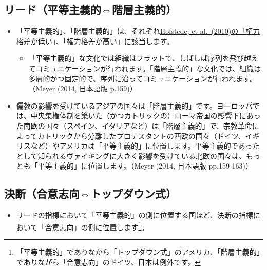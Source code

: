 \documentclass[
]{book}
\providecommand{\tightlist}{%
  \setlength{\itemsep}{0pt}\setlength{\parskip}{0pt}}
\begin{document}
\hypertarget{ux30eaux30fcux30c9ux5e73ux7b49ux4e3bux7fa9ux7684ux968eux5c64ux4e3bux7fa9ux7684}{%
\subsection{リード（平等主義的⇔階層主義的）}\label{ux30eaux30fcux30c9ux5e73ux7b49ux4e3bux7fa9ux7684ux968eux5c64ux4e3bux7fa9ux7684}}

\begin{itemize}
\item
  「平等主義的」、「階層主義的」は、それぞれ\protect\hyperlink{hofstede}{Hofstede, et al.~(2010)の「権力格差が低い」、「権力格差が高い」に該当します}。

  \begin{itemize}
  \tightlist
  \item
    「平等主義的」な文化では組織はフラットで、しばしば序列を飛び越えてコミュニケーションが行われます。「階層主義的」な文化では、組織は多層的かつ固定的で、序列に沿ってコミュニケーションが行われます。（Meyer (2014, 日本語版 p.159)）
  \end{itemize}
\item
  儒教の影響を受けているアジアの国々は「階層主義的」です。ヨーロッパでは、中央集権体制を築いた（かつカトリックの）ローマ帝国の影響下にあった南欧の国々（スペイン、イタリアなど）は「階層主義的」で、宗教革命によってカトリックから分離したプロテスタントの西欧の国々（ドイツ、イギリスなど）やアメリカは「平等主義的」に位置します。平等主義的であったとして知られるヴァイキングに大きく影響を受けている北欧の国々は、もっとも「平等主義的」に位置します。（Meyer (2014, 日本語版 pp.159-163)）
\end{itemize}

\hypertarget{ux6c7aux65adux5408ux610fux5fd7ux5411ux30c8ux30c3ux30d7ux30c0ux30a6ux30f3ux5f0f}{%
\subsection{決断（合意志向⇔トップダウン式）}\label{ux6c7aux65adux5408ux610fux5fd7ux5411ux30c8ux30c3ux30d7ux30c0ux30a6ux30f3ux5f0f}}

\begin{itemize}
\tightlist
\item
  リードの指標において「平等主義的」の側に位置する国ほど、決断の指標において「合意志向」の側に位置します\footnote{「平等主義的」でありながら「トップダウン式」のアメリカ、「階層主義的」でありながら「合意志向」のドイツ、日本は例外です。}。
\end{itemize}
\end{document}
